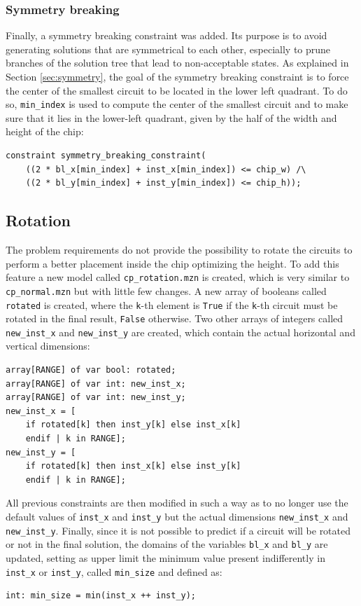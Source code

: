 \documentclass[a4paper, 12pt]{article}
\begin{document}
\subsubsection{Symmetry breaking}\label{sec:cp-symmetry}

Finally, a symmetry breaking constraint was added. Its purpose is to avoid generating solutions that are symmetrical to each other, especially to prune branches of the solution tree that lead to non-acceptable states. As explained in Section \ref{sec:symmetry}, the goal of the symmetry breaking constraint is to force the center of the smallest circuit to be located in the lower left quadrant. To do so, \verb|min_index| is used to compute the center of the smallest circuit and to make sure that it lies in the lower-left quadrant, given by the half of the width and height of the chip:
\begin{verbatim}
constraint symmetry_breaking_constraint(
    ((2 * bl_x[min_index] + inst_x[min_index]) <= chip_w) /\
    ((2 * bl_y[min_index] + inst_y[min_index]) <= chip_h));
 \end{verbatim}


\subsection{Rotation}
The problem requirements do not provide the possibility to rotate the circuits to perform a better placement inside the chip optimizing the height. To add this feature a new model called \verb|cp_rotation.mzn| is created, which is very similar to \verb|cp_normal.mzn| but with little few changes. A new array of booleans called \verb|rotated| is created, where the \verb|k|-th element is \verb|True| if the \verb|k|-th circuit must be rotated in the final result, \verb|False| otherwise. Two other arrays of integers called \verb|new_inst_x| and \verb|new_inst_y| are created, which contain the actual horizontal and vertical dimensions:
\begin{verbatim}
array[RANGE] of var bool: rotated;
array[RANGE] of var int: new_inst_x;
array[RANGE] of var int: new_inst_y;
new_inst_x = [
    if rotated[k] then inst_y[k] else inst_x[k]
    endif | k in RANGE];
new_inst_y = [
    if rotated[k] then inst_x[k] else inst_y[k]
    endif | k in RANGE];
 \end{verbatim}
 
All previous constraints are then modified in such a way as to no longer use the default values of \verb|inst_x| and \verb|inst_y| but the actual dimensions \verb|new_inst_x| and \verb|new_inst_y|. Finally, since it is not possible to predict if a circuit will be rotated or not in the final solution, the domains of the variables \verb|bl_x| and \verb|bl_y| are updated, setting as upper limit the minimum value present indifferently in \verb|inst_x| or \verb|inst_y|, called \verb|min_size| and defined as:
\begin{verbatim}
int: min_size = min(inst_x ++ inst_y);
 \end{verbatim}
\end{document}
